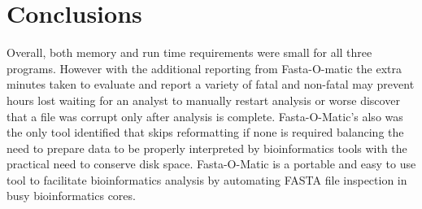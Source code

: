 \section{Conclusions}
Overall, both memory and run time requirements were small for all three programs. However with the additional reporting from Fasta-O-matic the extra minutes taken to evaluate and report a variety of fatal and non-fatal may prevent hours lost waiting for an analyst to manually restart analysis or worse discover that a file was corrupt only after analysis is complete. Fasta-O-Matic's also was the only tool identified that skips reformatting if none is required balancing the need to prepare data to be properly interpreted by bioinformatics tools with the practical need to conserve disk space. Fasta-O-Matic is a portable and easy to use tool to facilitate bioinformatics analysis by automating FASTA file inspection in busy bioinformatics cores.
  